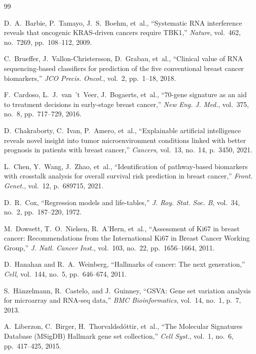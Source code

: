 \documentclass[journal]{IEEEtran}
\begin{document}
\begin{thebibliography}{99}

D.~A.~Barbie, P.~Tamayo, J.~S.~Boehm, et~al., ``Systematic RNA interference reveals that oncogenic KRAS-driven cancers require TBK1,'' \textit{Nature}, vol.~462, no.~7269, pp.~108--112, 2009.

C.~Brueffer, J.~Vallon-Christersson, D.~Grabau, et~al., ``Clinical value of RNA sequencing-based classifiers for prediction of the five conventional breast cancer biomarkers,'' \textit{JCO Precis. Oncol.}, vol.~2, pp.~1--18, 2018.

F.~Cardoso, L.~J.~van~'t~Veer, J.~Bogaerts, et~al., ``70-gene signature as an aid to treatment decisions in early-stage breast cancer,'' \textit{New Eng. J. Med.}, vol.~375, no.~8, pp.~717--729, 2016.

D.~Chakraborty, C.~Ivan, P.~Amero, et~al., ``Explainable artificial intelligence reveals novel insight into tumor microenvironment conditions linked with better prognosis in patients with breast cancer,'' \textit{Cancers}, vol.~13, no.~14, p.~3450, 2021.

L.~Chen, Y.~Wang, J.~Zhao, et~al., ``Identification of pathway-based biomarkers with crosstalk analysis for overall survival risk prediction in breast cancer,'' \textit{Front. Genet.}, vol.~12, p.~689715, 2021.

D.~R.~Cox, ``Regression models and life-tables,'' \textit{J. Roy. Stat. Soc. B}, vol.~34, no.~2, pp.~187--220, 1972.

M.~Dowsett, T.~O.~Nielsen, R.~A'Hern, et~al., ``Assessment of Ki67 in breast cancer: Recommendations from the International Ki67 in Breast Cancer Working Group,'' \textit{J. Natl. Cancer Inst.}, vol.~103, no.~22, pp.~1656--1664, 2011.

D.~Hanahan and R.~A.~Weinberg, ``Hallmarks of cancer: The next generation,'' \textit{Cell}, vol.~144, no.~5, pp.~646--674, 2011.

S.~H\"{a}nzelmann, R.~Castelo, and J.~Guinney, ``GSVA: Gene set variation analysis for microarray and RNA-seq data,'' \textit{BMC Bioinformatics}, vol.~14, no.~1, p.~7, 2013.

A.~Liberzon, C.~Birger, H.~Thorvaldsd\'{o}ttir, et~al., ``The Molecular Signatures Database (MSigDB) Hallmark gene set collection,'' \textit{Cell Syst.}, vol.~1, no.~6, pp.~417--425, 2015.


\end{thebibliography}
\end{document}
